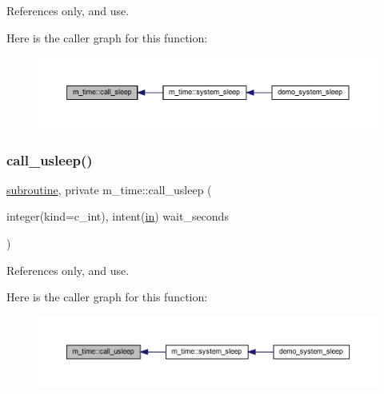 References only, and use.

Here is the caller graph for this function\+:
\nopagebreak
\begin{figure}[H]
\begin{center}
\leavevmode
\includegraphics[width=350pt]{namespacem__time_af558bfc1fd5b13a6b879b3969866956f_icgraph}
\end{center}
\end{figure}
\mbox{\label{namespacem__time_ae63783f7479d2f5093c8031d38ce4304}} 
\subsubsection{\texorpdfstring{call\+\_\+usleep()}{call\_usleep()}}
{\footnotesize\ttfamily \hyperlink{M__stopwatch_83_8txt_acfbcff50169d691ff02d4a123ed70482}{subroutine}, private m\+\_\+time\+::call\+\_\+usleep (\begin{DoxyParamCaption}\item[{integer(kind=c\+\_\+int), intent(\hyperlink{M__journal_83_8txt_afce72651d1eed785a2132bee863b2f38}{in})}]{wait\+\_\+seconds }\end{DoxyParamCaption})\hspace{0.3cm}{\ttfamily [private]}}



References only, and use.

Here is the caller graph for this function\+:
\nopagebreak
\begin{figure}[H]
\begin{center}
\leavevmode
\includegraphics[width=350pt]{namespacem__time_ae63783f7479d2f5093c8031d38ce4304_icgraph}
\end{center}
\end{figure}
\mbox{\label{namespacem__time_a3fccc53c2650104eff084c7998d18f54}} 
